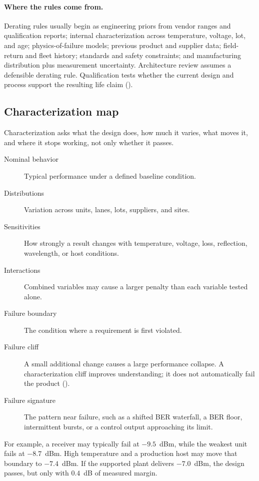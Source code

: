 \paragraph{Where the rules come from.}

Derating rules usually begin as engineering priors from vendor ranges and
qualification reports; internal characterization across temperature, voltage,
lot, and age; physics-of-failure models; previous product and supplier data;
field-return and fleet history; standards and safety constraints; and
manufacturing distribution plus measurement uncertainty. Architecture review
assumes a defensible derating rule. Qualification tests whether the current
design and process support the resulting life claim
().

\subsection{Characterization map}
\label{sec:ladder-characterization-detail}

Characterization asks what the design does, how much it varies, what moves it,
and where it stops working, not only whether it passes.

\begin{description}
\item[Nominal behavior] Typical performance under a defined baseline condition.
\item[Distributions] Variation across units, lanes, lots, suppliers, and sites.
\item[Sensitivities] How strongly a result changes with temperature, voltage,
      loss, reflection, wavelength, or host conditions.
\item[Interactions] Combined variables may cause a larger penalty than each
      variable tested alone.
\item[Failure boundary] The condition where a requirement is first violated.
\item[Failure cliff] A small additional change causes a large performance
      collapse. A characterization cliff improves understanding; it does not
      automatically fail the product ().
\item[Failure signature] The pattern near failure, such as a shifted BER
      waterfall, a BER floor, intermittent bursts, or a control output
      approaching its limit.
\end{description}

For example, a receiver may typically fail at $-9.5$~dBm, while the weakest unit
fails at $-8.7$~dBm. High temperature and a production host may move that
boundary to $-7.4$~dBm. If the supported plant delivers $-7.0$~dBm, the design
passes, but only with $0.4$~dB of measured margin.

